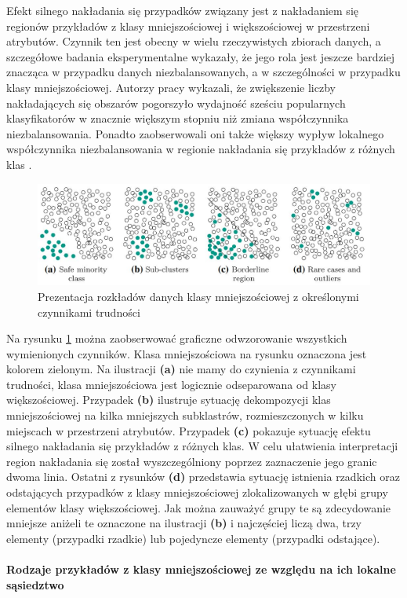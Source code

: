 \noindent Efekt silnego nakładania się przypadków związany jest z nakładaniem się regionów przykładów z klasy mniejszościowej i większościowej w przestrzeni atrybutów. Czynnik ten jest obecny w wielu rzeczywistych zbiorach danych, a szczegółowe badania eksperymentalne wykazały, że jego rola jest jeszcze bardziej znacząca w przypadku danych niezbalansowanych, a w szczególności w przypadku klasy mniejszościowej. Autorzy pracy \cite{Article:DataDistribution4} wykazali, że zwiększenie liczby nakładających się obszarów pogorszyło wydajność sześciu popularnych klasyfikatorów w znacznie większym stopniu niż zmiana współczynnika niezbalansowania. Ponadto zaobserwowali oni także większy wypływ lokalnego współczynnika niezbalansowania w regionie nakładania się przykładów z różnych klas \cite{Article:TypyPrzykladow}.

\begin{figure}[h] 
    \centering
    \includegraphics[width=15cm]{figures/data_examples.JPG}
    \caption{Prezentacja rozkładów danych klasy mniejszościowej z określonymi czynnikami trudności \cite{Article:TypyPrzykladow}}\label{Figure:TypesExample}
\end{figure}

\noindent Na rysunku \ref{Figure:TypesExample} można zaobserwować graficzne odwzorowanie wszystkich wymienionych czynników. Klasa mniejszościowa na rysunku oznaczona jest kolorem zielonym. Na ilustracji \textbf{(a)} nie mamy do czynienia z czynnikami trudności, klasa mniejszościowa jest logicznie odseparowana od klasy większościowej. Przypadek \textbf{(b)} ilustruje sytuację dekompozycji klas mniejszościowej na kilka mniejszych subklastrów, rozmieszczonych w kilku miejscach w przestrzeni atrybutów. Przypadek \textbf{(c)} pokazuje sytuację efektu silnego nakładania się przykładów z różnych klas. W celu ułatwienia interpretacji region nakładania się został wyszczególniony poprzez zaznaczenie jego granic dwoma linia. Ostatni z rysunków \textbf{(d)} przedstawia sytuację istnienia rzadkich oraz odstających przypadków z klasy mniejszościowej zlokalizowanych w głębi grupy elementów klasy większościowej. Jak można zauważyć grupy te są zdecydowanie mniejsze aniżeli te oznaczone na ilustracji \textbf{(b)} i najczęściej liczą dwa, trzy elementy (przypadki rzadkie) lub pojedyncze elementy (przypadki odstające).\\\\
\textbf{Rodzaje przykładów z klasy mniejszościowej ze względu na ich lokalne sąsiedztwo}\\

